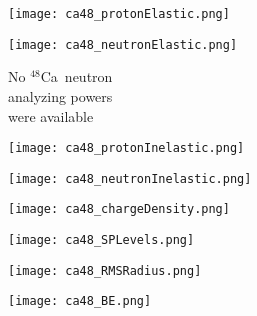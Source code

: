 \documentclass[twocolumn,secnumarabic,amssymb, nobibnotes, aps, prl,
superscriptaddress, nobalancelastpage, floatfix]{revtex4}
\newcommand{\caEight}{\ensuremath{^{48}}C\lowercase{a}}
\begin{document}
{\begin{figure*}[!htb]
    \centering
    \begin{minipage}{0.4\linewidth}
        \centering
        \texttt{[image: ca48\_protonElastic.png]}
        \label{DOM_ca48_proton_elastic}
    \end{minipage}\hspace{6pt}
    \begin{minipage}{0.4\linewidth}
        \centering
        \vspace{-10pt}
        \begin{minipage}[c]{0.5\linewidth}
            \centering
                \texttt{[image: ca48\_neutronElastic.png]}
        \end{minipage}
        \begin{minipage}[c]{0.45\linewidth}
            \centering
            No \caEight\ neutron \\
            analyzing powers \\
            were available
        \end{minipage}
        \label{DOM_ca48_neutron_elastic}
    \end{minipage}
    \centering
    \begin{minipage}{0.4\linewidth}
        \centering
        \texttt{[image: ca48\_protonInelastic.png]}
        \label{DOM_ca48_proton_inelastic}
    \end{minipage}\hspace{6pt}
    \begin{minipage}{0.4\linewidth}
        \centering
        \texttt{[image: ca48\_neutronInelastic.png]}
        \label{DOM_ca48_neutron_inelastic}
    \end{minipage}
    \centering
    \begin{minipage}{0.4\linewidth}
        \centering
        \texttt{[image: ca48\_chargeDensity.png]}
        \label{DOM_ca48_chargeDensity}
    \end{minipage}\hspace{6pt}
    \begin{minipage}{0.4\linewidth}
        \centering
        \texttt{[image: ca48\_SPLevels.png]}
        \label{DOM_ca48_SPLevels}
    \end{minipage}
    \begin{minipage}{0.4\linewidth}
        \centering
        \texttt{[image: ca48\_RMSRadius.png]}
        \label{DOM_ca48_RMSRadius}
    \end{minipage}\hspace{6pt}
    \begin{minipage}{0.4\linewidth}
        \centering
        \texttt{[image: ca48\_BE.png]}
        \label{DOM_ca48_BE}
    \end{minipage}
    \caption{\caEight: constraining experimental data and DOM fit. See introduction of
    Appendix C for description.}
    \label{DOM_ca48}
\end{figure*}

}
\end{document}
